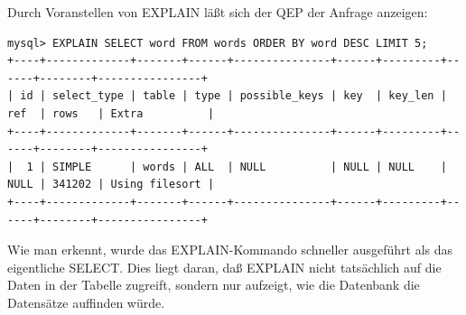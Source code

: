 Durch Voranstellen von EXPLAIN läßt sich der QEP der Anfrage anzeigen:
\begin{lstlisting}[basicstyle=\ttfamily\scriptsize,caption=EXPLAIN mit einfachem SELECT]
mysql> EXPLAIN SELECT word FROM words ORDER BY word DESC LIMIT 5;
+----+-------------+-------+------+---------------+------+---------+------+--------+----------------+
| id | select_type | table | type | possible_keys | key  | key_len | ref  | rows   | Extra          |
+----+-------------+-------+------+---------------+------+---------+------+--------+----------------+
|  1 | SIMPLE      | words | ALL  | NULL          | NULL | NULL    | NULL | 341202 | Using filesort |
+----+-------------+-------+------+---------------+------+---------+------+--------+----------------+
\end{lstlisting}
Wie man erkennt, wurde das EXPLAIN-Kommando schneller ausgeführt als das eigentliche SELECT.
Dies liegt daran, daß EXPLAIN nicht tatsächlich auf die Daten in der Tabelle zugreift, sondern nur aufzeigt, wie die Datenbank die Datensätze auffinden würde.

